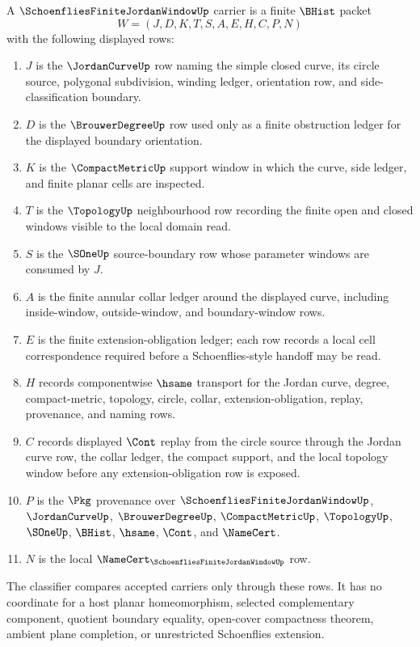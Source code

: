 \begin{definition}
\label{def:schoenflies-finite-jordan-window-carrier}
A $\SchoenfliesFiniteJordanWindowUp$ carrier is a finite $\BHist$ packet
$$
W=(J,D,K,T,S,A,E,H,C,P,N)
$$
with the following displayed rows:
\begin{enumerate}
\item $J$ is the $\JordanCurveUp$ row naming the simple closed curve, its circle source, polygonal subdivision, winding ledger, orientation row, and side-classification boundary.
\item $D$ is the $\BrouwerDegreeUp$ row used only as a finite obstruction ledger for the displayed boundary orientation.
\item $K$ is the $\CompactMetricUp$ support window in which the curve, side ledger, and finite planar cells are inspected.
\item $T$ is the $\TopologyUp$ neighbourhood row recording the finite open and closed windows visible to the local domain read.
\item $S$ is the $\SOneUp$ source-boundary row whose parameter windows are consumed by $J$.
\item $A$ is the finite annular collar ledger around the displayed curve, including inside-window, outside-window, and boundary-window rows.
\item $E$ is the finite extension-obligation ledger; each row records a local cell correspondence required before a Schoenflies-style handoff may be read.
\item $H$ records componentwise $\hsame$ transport for the Jordan curve, degree, compact-metric, topology, circle, collar, extension-obligation, replay, provenance, and naming rows.
\item $C$ records displayed $\Cont$ replay from the circle source through the Jordan curve row, the collar ledger, the compact support, and the local topology window before any extension-obligation row is exposed.
\item $P$ is the $\Pkg$ provenance over $\SchoenfliesFiniteJordanWindowUp$, $\JordanCurveUp$, $\BrouwerDegreeUp$, $\CompactMetricUp$, $\TopologyUp$, $\SOneUp$, $\BHist$, $\hsame$, $\Cont$, and $\NameCert$.
\item $N$ is the local $\NameCert_{\SchoenfliesFiniteJordanWindowUp}$ row.
\end{enumerate}
The classifier compares accepted carriers only through these rows. It has no coordinate for a host planar homeomorphism, selected complementary component, quotient boundary equality, open-cover compactness theorem, ambient plane completion, or unrestricted Schoenflies extension.
\end{definition}


